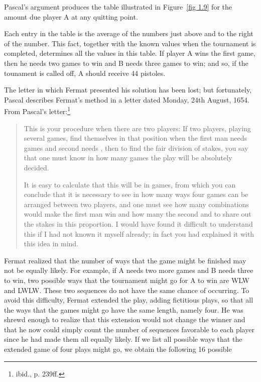 Pascal's argument produces the table illustrated in Figure~\ref{fig 1.9} for the amount
due player A at any quitting point.
\par
Each entry in the table is the average of the numbers just above and to the
right of the number.  This fact, together with the known values when the
tournament is completed, determines all the values in this table.  If player A
wins the first game, then he needs two games to win and B needs three games to
win; and so, if the tounament is called off, A should receive 44 pistoles.
\par
The letter in which Fermat presented his solution has been lost; but
fortunately, Pascal describes Fermat's method in a letter dated Monday, 24th
August, 1654.  From Pascal's letter:\footnote{ibid., p. 239ff.}
\begin{quote}
This is your procedure when there are two players: If two
players, playing several games, find themselves in that position when the first
man needs  games and second needs , then to find the fair
division of stakes, you say that one must know in how many games the play will
be absolutely decided.
\par
It is easy to calculate that this will be in  games, from which you
can conclude that it is necessary to see in how many ways four games can be
arranged between two players, and one must see how many combinations would make
the first man win and how many the second and to share out the stakes in this
proportion.  I would have found it difficult to understand this if I had not
known it myself already; in fact you had explained it with this idea in mind.
\end{quote}
\par
Fermat realized that the number of ways that the game might be finished may not
be equally likely.  For example, if A needs two more games and B needs three to
win, two possible ways that the tournament might go for A to win are WLW and
LWLW.  These two sequences do not have the same chance of occurring.  To avoid
this difficulty, Fermat extended the play, adding fictitious plays, so that all
the ways that the games might go have the same length, namely four.  He was
shrewd enough to realize that this extension would not change the winner and
that he now could simply count the number of sequences favorable to each player
since he had made them all equally likely.  If we list all possible ways that
the extended game of four plays might go, we obtain the following 16 possible
